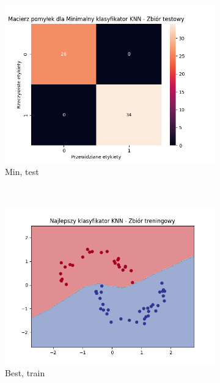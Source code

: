 \documentclass[12pt]{article}
\newcommand*{\subfigwidth}{0.24\textwidth}
\begin{document}
\begin{figure}[H]
\begin{subfigure}[t]{\subfigwidth}
        \includegraphics[width=\linewidth]{img/exp_3/knn/2_2/min/test_matrix.png}
        \caption{Min, test}
    \end{subfigure} 
    \\
    \begin{subfigure}[t]{\subfigwidth}
        \includegraphics[width=\linewidth]{img/exp_3/knn/2_2/best/train_boundary.png}
        \caption{Best, train}
    \end{subfigure}
    \hfill
    \begin{subfigure}[t]{\subfigwidth}

\end{subfigure}
\end{figure}
\end{document}
